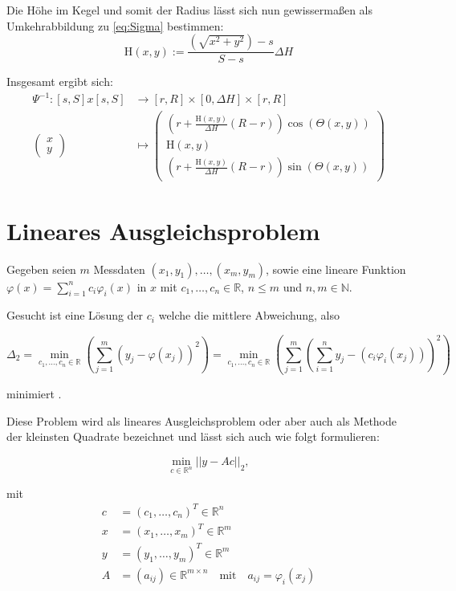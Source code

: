 Die Höhe  im Kegel und somit der Radius lässt sich nun gewissermaßen als Umkehrabbildung zu \ref{eq:Sigma} bestimmen:
\begin{equation*}
\mathrm{H}(x,y) := \frac{\left(\sqrt{x^2+y^2}\right) - s}{S - s}\Delta H
\end{equation*}

Insgesamt ergibt sich:
\begin{equation}\label{eq:LateralToCone}
\begin{aligned}
\Psi^{-1} \colon  [s,S]x[s,S] &\to [r,R] \times [0, \Delta H] \times [r,R]\\
\begin{pmatrix}
x \\ y
\end{pmatrix} &\mapsto
\begin{pmatrix}
\left( r + \frac{\mathrm{H}(x,y)}{\Delta H} (R - r)\right)\cos\left(\Theta(x,y) \right) \\
\mathrm{H}(x,y)\\
\left( r + \frac{\mathrm{H}(x,y)}{\Delta H} (R - r)\right)\sin\left(\Theta(x,y) \right)
\end{pmatrix}
\end{aligned}
\end{equation}


\section{Lineares Ausgleichsproblem}
\label{s:LSQ}
Gegeben seien $m$ Messdaten $(x_1,y_1),\dotsc,(x_m,y_m)$, sowie eine lineare Funktion $\varphi(x) = \sum_{i = 1}^{n}c_i\varphi_i(x)$ in $x$ mit $c_1,\dotsc,c_n\in\mathbb{R}$, $n\leq m$ und $n,m\in\mathbb{N}$. 

Gesucht ist eine Lösung der $c_i$ welche die mittlere Abweichung, also 

\[
\Delta_2 = \min_{c_1,\dotsc,c_n\in\mathbb{R}} \left(\sum_{j=1}^{m}\left(y_j - \varphi(x_j)\right)^2\right) = \min_{c_1,\dotsc,c_n\in\mathbb{R}} \left(\sum_{j=1}^{m}\left(\sum_{i=1}^{n}y_j-\left(c_i\varphi_i(x_j)\right)\right)^2\right)
\]

minimiert \cite{Stoer2007}.

Diese Problem wird als lineares Ausgleichsproblem oder aber auch als Methode der kleinsten Quadrate bezeichnet und lässt sich auch wie folgt formulieren:

\[
\min_{c\in\mathbb{R}^n} ||y - Ac||_2,
\]

mit 
\[
\begin{aligned}
c &= (c_1,\dotsc,c_n)^T\in\mathbb{R}^n \\
x &= (x_1,\dotsc,x_m)^T\in\mathbb{R}^m \\
y &= (y_1,\dotsc,y_m)^T\in\mathbb{R}^m \\
A &= (a_{ij})\in\mathbb{R}^{m\times n}\quad\text{mit}\quad a_{ij} = \varphi_i(x_j)
\end{aligned}
\]

